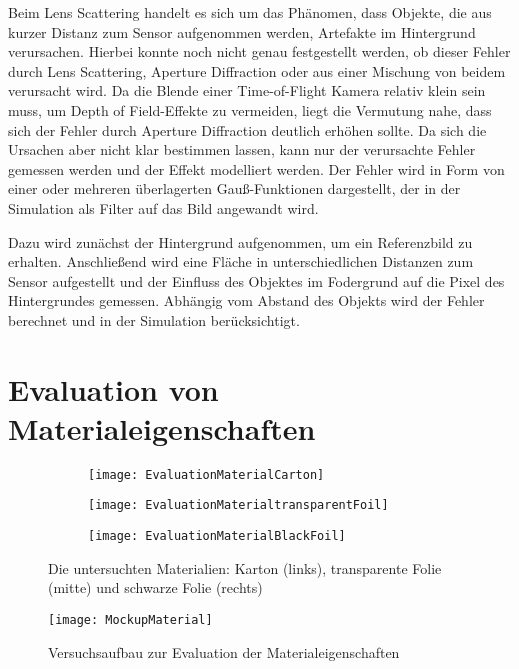 \documentclass[thesis.tex]{subfiles}
\begin{document}
Beim Lens Scattering handelt es sich um das Phänomen, dass Objekte, die aus kurzer Distanz zum Sensor aufgenommen werden, Artefakte im Hintergrund verursachen. Hierbei konnte noch nicht genau festgestellt werden, ob dieser Fehler durch Lens Scattering, Aperture Diffraction oder aus einer Mischung von beidem verursacht wird. Da die Blende einer Time-of-Flight Kamera relativ klein sein muss, um Depth of Field-Effekte zu vermeiden, liegt die Vermutung nahe, dass sich der Fehler durch Aperture Diffraction deutlich erhöhen sollte. Da sich die Ursachen aber nicht klar bestimmen lassen, kann nur der verursachte Fehler gemessen werden und der Effekt modelliert werden. Der Fehler wird in Form von einer oder mehreren überlagerten Gauß-Funktionen dargestellt, der in der Simulation als Filter auf das Bild angewandt wird.

Dazu wird zunächst der Hintergrund aufgenommen, um ein Referenzbild zu erhalten. Anschließend wird eine Fläche in unterschiedlichen Distanzen zum Sensor aufgestellt und der Einfluss des Objektes im Fodergrund auf die Pixel des Hintergrundes gemessen. Abhängig vom Abstand des Objekts wird der Fehler berechnet und in der Simulation berücksichtigt.

\newpage

\section{Evaluation von Materialeigenschaften}

\begin{figure}[h]
\centering
\begin{subfigure}{.25\textwidth}
  \centering
  \texttt{[image: EvaluationMaterialCarton]}
\end{subfigure}%
\begin{subfigure}{.25\textwidth}
  \centering
  \texttt{[image: EvaluationMaterialtransparentFoil]}
\end{subfigure}
\begin{subfigure}{.25\textwidth}
  \centering
  \texttt{[image: EvaluationMaterialBlackFoil]}
\end{subfigure}
\caption{Die untersuchten Materialien: Karton (links), transparente Folie (mitte) und schwarze Folie (rechts)}
\end{figure}

\begin{figure}[h]
\centering
  \texttt{[image: MockupMaterial]}
  \label{fig:MockupMaterial}
  \caption{Versuchsaufbau zur Evaluation der Materialeigenschaften}
\end{figure}
\end{document}
